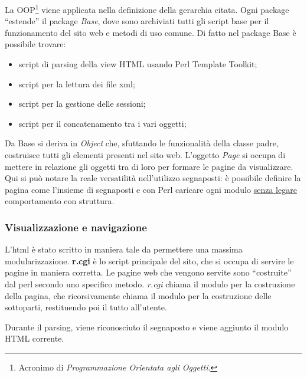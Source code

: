 La OOP\footnote{Acronimo di \textit{Programmazione Orientata agli Oggetti}.} viene applicata nella definizione della gerarchia citata. Ogni package ``estende'' il package \textit{Base}, dove sono archiviati tutti gli script base per il funzionamento del sito web e metodi di uso comune. Di fatto nel package Base \`e possibile trovare:
\begin{itemize}
\item script di parsing della view HTML usando Perl Template Toolkit;
\item script per la lettura dei file xml;
\item script per la gestione delle sessioni;
\item script per il concatenamento tra i vari oggetti;
\end{itemize}

Da Base si deriva in \textit{Object} che, sfuttando le funzionalit\`a della classe padre, costruisce tutti gli elementi presenti nel sito web. L'oggetto \textit{Page} si occupa di mettere in relazione gli oggetti tra di loro per formare le pagine da visualizzare. Qui si pu\`o notare la reale versatilit\`a nell'utilizzo segnaposti: \`e possibile definire la pagina come l'insieme di segnaposti e con Perl caricare ogni modulo \underline{senza legare} comportamento con struttura.




\subsubsection{Visualizzazione e navigazione}

L'html \`e stato scritto in maniera tale da permettere una massima modularizzazione. \textbf{r.cgi} \`e lo script principale del sito, che si occupa di servire le pagine in maniera corretta.
Le pagine web che vengono servite sono ``costruite'' dal perl secondo uno specifico metodo. \textit{r.cgi} chiama il modulo per la costruzione della pagina, che ricorsivamente chiama il modulo per la costruzione delle sottoparti, restituendo poi il tutto all'utente.

Durante il parsing, viene riconosciuto il segnaposto e viene aggiunto il modulo HTML corrente.
